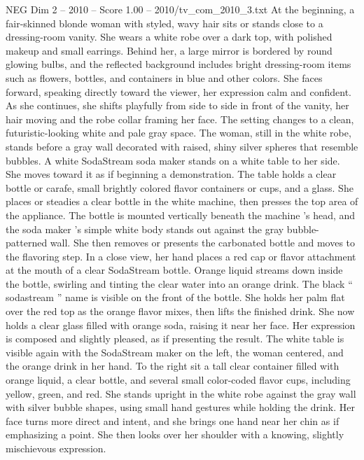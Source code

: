 \begin{textsample}{NEG Dim 2 – 2010 – Score 1.00 – 2010/tv\_com\_2010\_3.txt}  \label{ex:f2_neg_048}
At the beginning, a fair-skinned blonde woman with styled, wavy hair sits or stands close to a dressing-room vanity.
She wears a white robe over a dark top, with polished makeup and small earrings.
Behind her, a large mirror is bordered by round glowing bulbs, and the reflected background includes bright dressing-room items such as flowers, bottles, and containers in blue and other colors.
She faces forward, speaking directly toward the viewer, her expression calm and confident.
As she continues, she shifts playfully from side to side in front of the vanity, her hair moving and the robe collar framing her face.
The setting changes to a clean, futuristic-looking white and pale gray space.
The woman, still in the white robe, stands before a gray wall decorated with raised, shiny silver spheres that resemble bubbles.
A white SodaStream soda maker stands on a white table to her side.
She moves toward it as if beginning a demonstration.
The table holds a clear bottle or carafe, small brightly colored flavor containers or cups, and a glass.
She places or steadies a clear bottle in the white machine, then presses the top area of the appliance.
The bottle is mounted vertically beneath the machine ’s head, and the soda maker ’s simple white body stands out against the gray bubble-patterned wall.
She then removes or presents the carbonated bottle and moves to the flavoring step.
In a close view, her hand places a red cap or flavor attachment at the mouth of a clear SodaStream bottle.
Orange liquid streams down inside the bottle, swirling and tinting the clear water into an orange drink.
The black “ sodastream ” name is visible on the front of the bottle.
She holds her palm flat over the red top as the orange flavor mixes, then lifts the finished drink.
She now holds a clear glass filled with orange soda, raising it near her face.
Her expression is composed and slightly pleased, as if presenting the result.
The white table is visible again with the SodaStream maker on the left, the woman centered, and the orange drink in her hand.
To the right sit a tall clear container filled with orange liquid, a clear bottle, and several small color-coded flavor cups, including yellow, green, and red.
She stands upright in the white robe against the gray wall with silver bubble shapes, using small hand gestures while holding the drink.
Her face turns more direct and intent, and she brings one hand near her chin as if emphasizing a point.
She then looks over her shoulder with a knowing, slightly mischievous expression.

\end{textsample}
